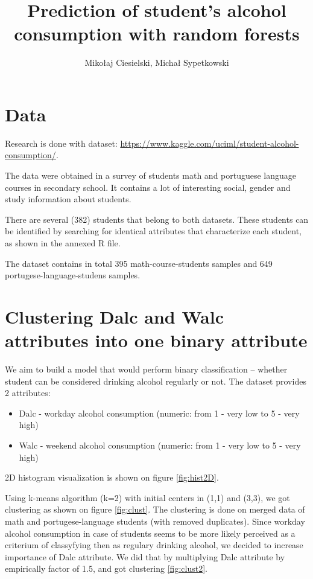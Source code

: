 \documentclass[a4paper]{article}
\begin{document}
\title{Prediction of student's alcohol consumption with random forests}

\author{Mikołaj Ciesielski, Michał Sypetkowski}
\maketitle


\section{Data}

Research is done with dataset: \url{https://www.kaggle.com/uciml/student-alcohol-consumption/}.

The data were obtained in a survey of students
math and portuguese language courses in secondary school.
It contains a lot of interesting social,
gender and study information about students.

There are several (382) students that belong to both datasets.
These students can be identified by searching for identical attributes
that characterize each student, as shown in the annexed R file.

The dataset contains in total 395 math-course-students samples and 
649 portugese-language-studens samples.


\section{Clustering Dalc and Walc attributes into one binary attribute}

We aim to build a model that would perform binary classification --
whether student can be considered drinking alcohol regularly or not.
The dataset provides 2 attributes:
\begin{itemize}
    \item Dalc - workday alcohol consumption (numeric: from 1 - very low to 5 - very high)
    \item Walc - weekend alcohol consumption (numeric: from 1 - very low to 5 - very high)
\end{itemize}
2D histogram visualization is shown on figure \ref{fig:hist2D}.

Using k-means algorithm (k=2) with initial centers in (1,1) and (3,3), we got clustering as shown on figure \ref{fig:clust}.
The clustering is done on merged data of math and portugese-language students (with removed duplicates).
Since workday alcohol consumption in case of students seems
to be more likely perceived as a criterium of classyfying then as
regulary drinking alcohol,
we decided to increase importance of Dalc attribute.
We did that by multiplying Dalc attribute by empirically factor of 1.5, and got clustering \ref{fig:clust2}.
\end{document}
